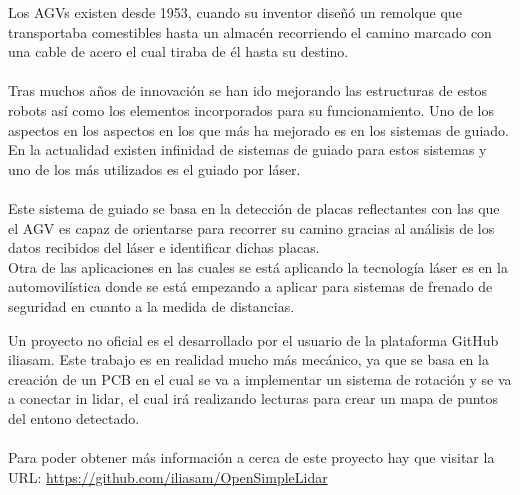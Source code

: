 
Los AGVs existen desde 1953, cuando su inventor diseñó un remolque que transportaba comestibles hasta un almacén recorriendo el camino marcado con una cable de acero el cual tiraba de él hasta su destino.\\
\\
Tras muchos años de innovación se han ido mejorando las estructuras de estos robots así como los elementos incorporados para su funcionamiento. Uno de los aspectos en los aspectos en los que más ha mejorado es en los sistemas de guiado. En la actualidad existen infinidad de sistemas de guiado para estos sistemas y uno de los más utilizados es el guiado por láser.\\
\\
Este sistema de guiado se basa en la detección de placas reflectantes con las que el AGV es capaz de orientarse para recorrer su camino gracias al análisis de los datos recibidos del láser e identificar dichas placas.\\
Otra de las aplicaciones en las cuales se está aplicando la tecnología láser es en la automovilística donde se está empezando a aplicar para sistemas de frenado de seguridad en cuanto a la medida de distancias.\\

Un proyecto no oficial es el desarrollado por el usuario de la plataforma GitHub iliasam. Este trabajo es en realidad mucho más mecánico, ya que se basa en la creación de un PCB en el cual se va a implementar un sistema de rotación y se va a conectar in lidar, el cual irá realizando lecturas para crear un mapa de puntos del entono detectado.\\
\\
Para poder obtener más información a cerca de este proyecto hay que visitar la URL: \url{https://github.com/iliasam/OpenSimpleLidar}